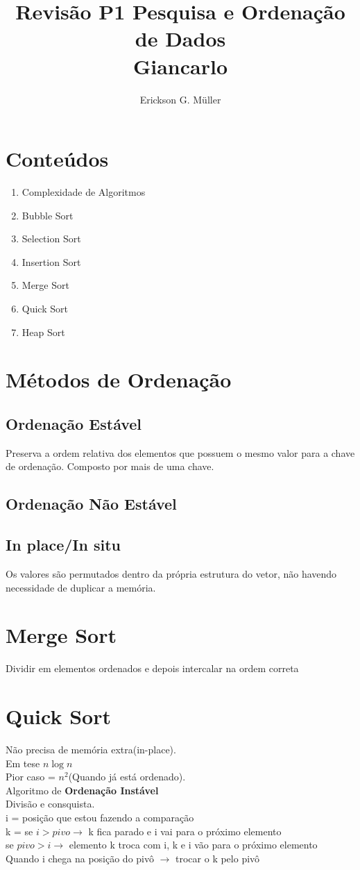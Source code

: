 \documentclass[•]{article}
\title{Revisão P1 Pesquisa e Ordenação de Dados\\Giancarlo}
\author{Erickson G. Müller}
\begin{document}
	\maketitle
	\section{Conteúdos}
		\begin{enumerate}
			\item Complexidade de Algoritmos
			\item Bubble Sort
			\item Selection Sort
			\item Insertion Sort
			\item Merge Sort
			\item Quick Sort
			\item Heap Sort
		\end{enumerate}
	\newpage
	\section{Métodos de Ordenação}
		\subsection{Ordenação Estável}
			Preserva a ordem relativa dos elementos que possuem o mesmo valor para a chave de ordenação. Composto por mais de uma chave.
		\subsection{Ordenação Não Estável}
		\subsection{In place/In situ}
			Os valores são permutados dentro da própria estrutura do vetor, não havendo necessidade de duplicar a memória.

	\section{Merge Sort}	
		\begin{center}
			Dividir em elementos ordenados  e depois intercalar na ordem correta
		\end{center}
	\section{Quick Sort}
		Não precisa de memória extra(in-place).\\
		Em tese $n \log n$\\
		Pior caso = $n^2$(Quando já está ordenado).\\
		Algoritmo de \textbf{Ordenação Instável}\\
		Divisão e consquista.\\
		i = posição que estou fazendo a comparação\\
		k = 
		se $i>pivo \to$ k fica parado e i vai para o próximo elemento\\
		se $pivo>i \to$ elemento k troca com i, k e i vão para o próximo elemento\\
		Quando i chega na posição do pivô $\to$ trocar o k pelo pivô
\end{document}
